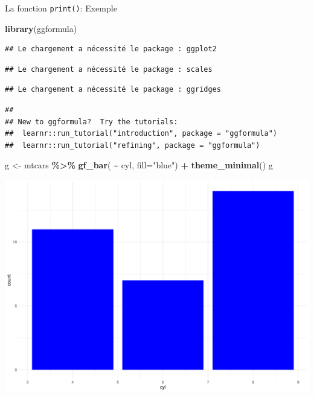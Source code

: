 \documentclass[
  ignorenonframetext,
]{beamer}
\newenvironment{Shaded}{\begin{snugshade}}{\end{snugshade}}
\newcommand{\AttributeTok}[1]{\textcolor[rgb]{0.13,0.29,0.53}{#1}}
\newcommand{\FunctionTok}[1]{\textcolor[rgb]{0.13,0.29,0.53}{\textbf{#1}}}
\newcommand{\NormalTok}[1]{#1}
\newcommand{\OtherTok}[1]{\textcolor[rgb]{0.56,0.35,0.01}{#1}}
\newcommand{\SpecialCharTok}[1]{\textcolor[rgb]{0.81,0.36,0.00}{\textbf{#1}}}
\newcommand{\StringTok}[1]{\textcolor[rgb]{0.31,0.60,0.02}{#1}}
\begin{document}
\begin{frame}[fragile]{La fonction \texttt{print()}: Exemple}
\protect\hypertarget{la-fonction-print-exemple}{}
\tiny

\begin{Shaded}
\begin{Highlighting}[]
\FunctionTok{library}\NormalTok{(ggformula)}
\end{Highlighting}
\end{Shaded}

\begin{verbatim}
## Le chargement a nécessité le package : ggplot2
\end{verbatim}

\begin{verbatim}
## Le chargement a nécessité le package : scales
\end{verbatim}

\begin{verbatim}
## Le chargement a nécessité le package : ggridges
\end{verbatim}

\begin{verbatim}
## 
## New to ggformula?  Try the tutorials: 
##  learnr::run_tutorial("introduction", package = "ggformula")
##  learnr::run_tutorial("refining", package = "ggformula")
\end{verbatim}

\begin{Shaded}
\begin{Highlighting}[]
\NormalTok{g }\OtherTok{\textless{}{-}}\NormalTok{ mtcars }\SpecialCharTok{\%\textgreater{}\%} \FunctionTok{gf\_bar}\NormalTok{( }\SpecialCharTok{\textasciitilde{}}\NormalTok{ cyl, }\AttributeTok{fill=}\StringTok{"blue"}\NormalTok{) }\SpecialCharTok{+} \FunctionTok{theme\_minimal}\NormalTok{()}
\NormalTok{g}
\end{Highlighting}
\end{Shaded}

\begin{center}\includegraphics[width=0.7\linewidth]{Cours-R-Programmation_files/figure-beamer/unnamed-chunk-29-1} \end{center}

\normalsize
\end{frame}
\end{document}
